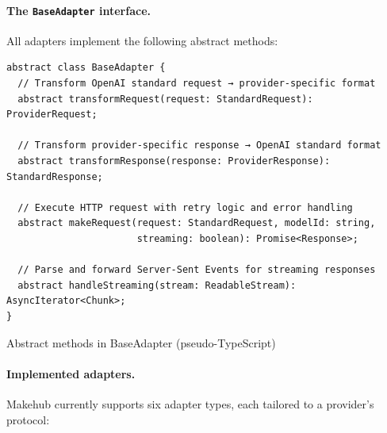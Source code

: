 \documentclass[english]{article}
\begin{document}
\paragraph{The \texttt{BaseAdapter} interface.}

All adapters implement the following abstract methods:

\begin{listing}[H]
\begin{verbatim}
abstract class BaseAdapter {
  // Transform OpenAI standard request → provider-specific format
  abstract transformRequest(request: StandardRequest): ProviderRequest;

  // Transform provider-specific response → OpenAI standard format
  abstract transformResponse(response: ProviderResponse): StandardResponse;

  // Execute HTTP request with retry logic and error handling
  abstract makeRequest(request: StandardRequest, modelId: string,
                       streaming: boolean): Promise<Response>;

  // Parse and forward Server-Sent Events for streaming responses
  abstract handleStreaming(stream: ReadableStream): AsyncIterator<Chunk>;
}
\end{verbatim}
\caption{Abstract methods in BaseAdapter (pseudo-TypeScript)}
\end{listing}

\paragraph{Implemented adapters.}

Makehub currently supports six adapter types, each tailored to a provider's protocol:
\end{document}
